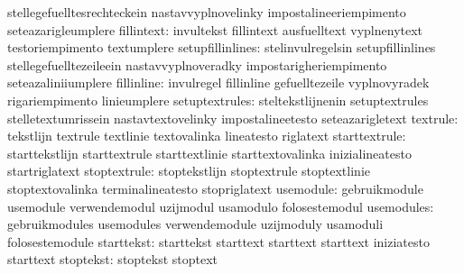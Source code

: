                                   stellegefuelltesrechteckein      nastavvyplnovelinky
                                  impostalineeriempimento          seteazarigleumplere
                      fillintext: invultekst                       fillintext
                                  ausfuelltext                     vyplnenytext
                                  testoriempimento                 textumplere
                setupfillinlines: stelinvulregelsin                setupfillinlines
                                  stellegefuelltezeileein          nastavvyplnoveradky
                                  impostarigheriempimento          seteazaliniiumplere
                      fillinline: invulregel                       fillinline
                                  gefuelltezeile                   vyplnovyradek
                                  rigariempimento                  linieumplere
                  setuptextrules: steltekstlijnenin                setuptextrules
                                  stelletextumrissein              nastavtextovelinky
                                  impostalineetesto                seteazarigletext
                        textrule: tekstlijn                        textrule
                                  textlinie                        textovalinka
                                  lineatesto                       riglatext
                   starttextrule: starttekstlijn                   starttextrule
                                  starttextlinie                   starttextovalinka
                                  inizialineatesto                 startriglatext
                    stoptextrule: stoptekstlijn                    stoptextrule
                                  stoptextlinie                    stoptextovalinka
                                  terminalineatesto                stopriglatext
                       usemodule: gebruikmodule                    usemodule
                                  verwendemodul                    uzijmodul
                                  usamodulo                        folosestemodul
                      usemodules: gebruikmodules                   usemodules
                                  verwendemodule                   uzijmoduly
                                  usamoduli                        folosestemodule
                      starttekst: starttekst                       starttext
                                  starttext                        starttext
                                  iniziatesto                      starttext
                       stoptekst: stoptekst                        stoptext
